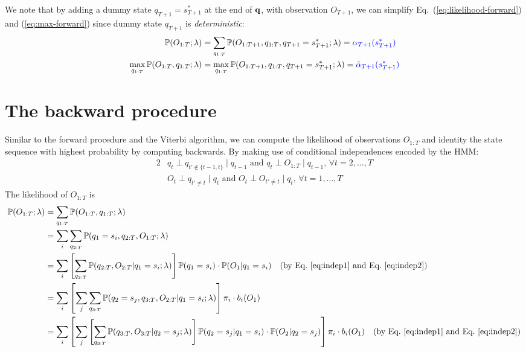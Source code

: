 We note that by adding a dummy state $q_{T+1} = s_{T+1}^*$ at the end of $\mathbf{q}$, with observation $O_{T+1}$, 
we can simplify Eq.~(\ref{eq:likelihood-forward}) and (\ref{eq:max-forward}) since dummy state $q_{T+1}$ is \emph{deterministic}:
\begin{align*}
\mathbb{P}(O_{1:T}; \lambda) 
&= \sum_{q_{1:T}} \mathbb{P}(O_{1:T+1}, q_{1:T}, q_{T+1} = s_{T+1}^*; \lambda)
 = {\color{blue}{\alpha_{T+1}(s_{T+1}^*)}} \\
\max_{q_{1:T}} \mathbb{P}(O_{1:T}, q_{1:T}; \lambda) 
&= \max_{q_{1:T}} \mathbb{P}(O_{1:T+1}, q_{1:T}, q_{T+1} = s_{T+1}^*; \lambda)
 = {\color{blue}{\tilde{\alpha}_{T+1}(s_{T+1}^*)}}
\end{align*}


\section{The backward procedure}
\label{sec:backward}

Similar to the forward procedure and the Viterbi algorithm, 
we can compute the likelihood of observations $O_{1:T}$ and identity the state sequence with highest probability by computing backwards.
By making use of conditional independences encoded by the HMM:
\begin{alignat}{2}
& q_t \perp q_{t' \notin \{t-1,t\}} \mid q_{t-1} \text{~and~} q_t \perp O_{1:T} \mid q_{t-1}, \, \forall t=2,\dots,T  \label{eq:indep1} \\
& O_t \perp q_{t' \ne t} \mid q_t \text{~and~} O_t \perp O_{t' \ne t} \mid q_t, \, \forall t=1,\dots,T                \label{eq:indep2}
\end{alignat}
The likelihood of $O_{1:T}$ is 
\begin{align*}
\mathbb{P}(O_{1:T} ;\lambda) 
&= \sum_{q_{1:T}} \mathbb{P}(O_{1:T},q_{1:T} ;\lambda) \\
&= \sum_{i} \sum_{q_{2:T}} \mathbb{P}(q_1 = s_i, q_{2:T}, O_{1:T} ;\lambda) \\
&= \sum_{i} \left[ \sum_{q_{2:T}} \mathbb{P}(q_{2:T}, O_{2:T} |q_1 = s_i; \lambda) \right] \mathbb{P}(q_1 = s_i) \cdot \mathbb{P}(O_1 |q_1 = s_i) 
   ~~~ \text{(by Eq.~\ref{eq:indep1} and Eq.~\ref{eq:indep2})} \\
&= \sum_{i} \left[ \sum_{j} \sum_{q_{3:T}} \mathbb{P}(q_2 = s_j, q_{3:T}, O_{2:T} |q_1 = s_i; \lambda) \right] \pi_i \cdot b_i(O_1) \\
&= \sum_{i} \left[ \sum_{j} \left[ \sum_{q_{3:T}} \mathbb{P}(q_{3:T}, O_{3:T} |q_2 = s_j; \lambda) \right] \mathbb{P}(q_2 = s_j |q_1 = s_i) \cdot \mathbb{P}(O_2 |q_2 = s_j) 
   \right] \pi_i \cdot b_i(O_1) 
   ~~~ \text{(by Eq.~\ref{eq:indep1} and Eq.~\ref{eq:indep2})}
\end{align*}

